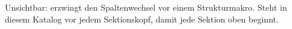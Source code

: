 
\begin{defbox}[][weight=quiet]
  \Muster
\end{defbox}


\begin{defbox}[][weight=quiet]
  Unsichtbar: erzwingt den Spaltenwechsel vor einem Strukturmakro. Steht in
  diesem Katalog vor jedem Sektionskopf, damit jede Sektion oben beginnt.
\end{defbox}
